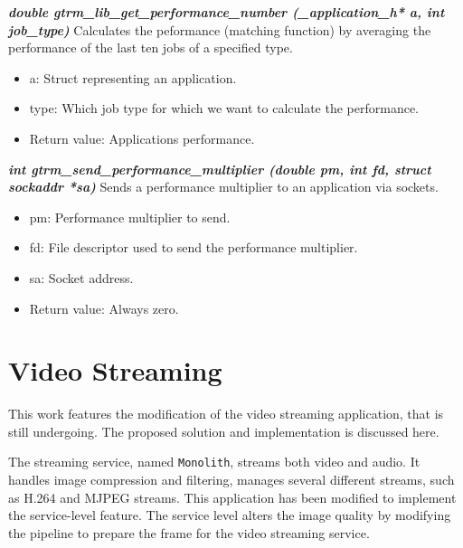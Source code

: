 \documentclass[nobiblatex]{LTHthesis}
\begin{document}
\begin{framed}
	\begin{flushleft}	
		\emph{\textbf{{double gtrm\_lib\_get\_performance\_number \newline
    (\_application\_h* a, int job\_type)}}} \newline
		Calculates the peformance (matching function) by averaging 
    the performance of the last ten jobs of a specified type.
		\begin{itemize}
		\item a: Struct representing an application.
		\item type: Which job type for which we want to calculate 
      the performance.
		\item Return value: Applications performance.
		\end{itemize}
	\end{flushleft}
\end{framed}

\begin{framed}
	\begin{flushleft}	
		\emph{\textbf{{int gtrm\_send\_performance\_multiplier \newline
    (double pm, int fd, struct sockaddr *sa)}}} \newline
		Sends a performance multiplier to an application via sockets.
		\begin{itemize} 
		\item pm: Performance multiplier to send.
		\item fd: File descriptor used to send the performance multiplier.
		\item sa: Socket address.
		\item Return value: Always zero.
		\end{itemize}
	\end{flushleft}
\end{framed}

\section{Video Streaming}

This work features the modification of the video streaming application,
that is still undergoing. The proposed solution and implementation is
discussed here.

The streaming service, named \texttt{Monolith}, streams both video and 
audio. It handles image compression and filtering, manages several different
streams, such as H.264 and MJPEG streams. This application has been modified
to implement the service-level feature. The service level alters the image
quality by modifying the pipeline to prepare the frame for the video
streaming service.
\end{document}

